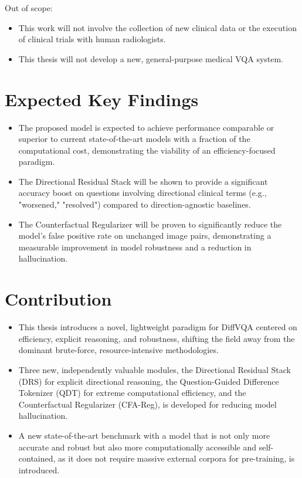 Out of scope:
\begin{itemize}
	\item This work will not involve the collection of new clinical data or the execution of clinical trials with human radiologists.
	\item This thesis will not develop a new, general-purpose medical VQA system.
\end{itemize}


\section{Expected Key Findings}
\begin{itemize}
	\item The proposed model is expected to achieve performance comparable or superior to current state-of-the-art models with a fraction of the computational cost, demonstrating the viability of an efficiency-focused paradigm.
	
	\item The Directional Residual Stack will be shown to provide a significant accuracy boost on questions involving directional clinical terms (e.g., "worsened," "resolved") compared to direction-agnostic baselines.
	
	\item The Counterfactual Regularizer will be proven to significantly reduce the model's false positive rate on unchanged image pairs, demonstrating a measurable improvement in model robustness and a reduction in hallucination.
\end{itemize}

\section{Contribution}
\begin{itemize}
	\item This thesis introduces a novel, lightweight paradigm for DiffVQA centered on efficiency, explicit reasoning, and robustness, shifting the field away from the dominant brute-force, resource-intensive methodologies.
	\item Three new, independently valuable modules, the Directional Residual Stack (DRS) for explicit directional reasoning, the Question-Guided Difference Tokenizer (QDT) for extreme computational efficiency, and the Counterfactual Regularizer (CFA-Reg), is developed for reducing model hallucination.
	\item A new state-of-the-art benchmark with a model that is not only more accurate and robust but also more computationally accessible and self-contained, as it does not require massive external corpora for pre-training, is introduced.
\end{itemize}